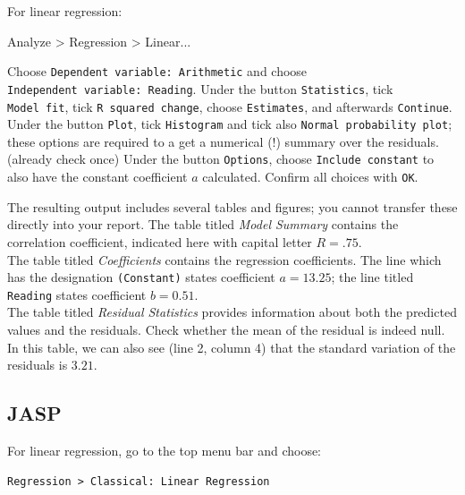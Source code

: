 \documentclass[
]{book}
\newenvironment{Shaded}{\begin{snugshade}}{\end{snugshade}}
\newcommand{\NormalTok}[1]{#1}
\begin{document}
For linear regression:

\begin{Shaded}
\begin{Highlighting}[]
\NormalTok{Analyze \textgreater{} Regression \textgreater{} Linear...}
\end{Highlighting}
\end{Shaded}

Choose \texttt{Dependent\ variable:\ Arithmetic} and choose
\texttt{Independent\ variable:\ Reading}. Under the button \texttt{Statistics}, tick
\texttt{Model\ fit}, tick \texttt{R\ squared\ change}, choose \texttt{Estimates}, and afterwards
\texttt{Continue}.\\
Under the button \texttt{Plot}, tick \texttt{Histogram} and tick also
\texttt{Normal\ probability\ plot}; these options are required to a get a
numerical (!) summary over the residuals.~
(already check once)
Under the button \texttt{Options}, choose \texttt{Include\ constant} to also have
the constant coefficient \(a\) calculated. Confirm all choices with \texttt{OK}.

The resulting output includes several tables and figures; you cannot
transfer these directly into your report. The table titled \emph{Model
Summary} contains the correlation coefficient, indicated here with capital
letter \(R=.75\).\\
The table titled \emph{Coefficients} contains the regression coefficients. The
line which has the designation \texttt{(Constant)} states coefficient \(a=13.25\);
the line titled \texttt{Reading} states coefficient \(b=0.51\).\\
The table titled \emph{Residual Statistics} provides information about both
the predicted values and the residuals. Check whether the mean of the residual
is indeed null. In this table, we can also see (line 2, column 4) that
the standard variation of the residuals is \(3.21\).

\subsection{JASP}\label{jasp-7}

For linear regression, go to the top menu bar and choose:

\begin{verbatim}
Regression > Classical: Linear Regression
\end{verbatim}
\end{document}
